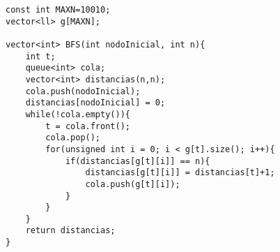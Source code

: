 \begin{verbatim}
const int MAXN=10010;
vector<ll> g[MAXN];

vector<int> BFS(int nodoInicial, int n){
	int t;
	queue<int> cola;
	vector<int> distancias(n,n);
	cola.push(nodoInicial);
	distancias[nodoInicial] = 0;
	while(!cola.empty()){
		t = cola.front();
		cola.pop();
		for(unsigned int i = 0; i < g[t].size(); i++){
			if(distancias[g[t][i]] == n){
				distancias[g[t][i]] = distancias[t]+1;
				cola.push(g[t][i]);
			}
		}
	}
	return distancias;
}
\end{verbatim}